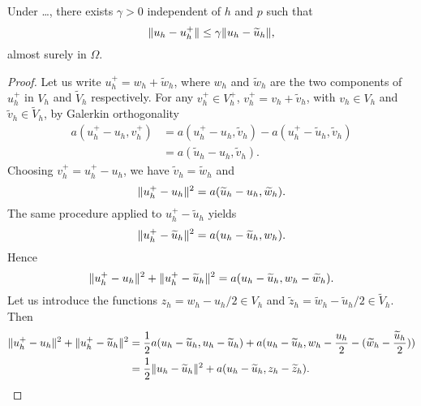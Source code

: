 \begin{lemma} Under \ldots, there exists $\gamma > 0$ independent of $h$ and $p$ such that
	\begin{equation}
		\lVert u_h - u_h^+\rVert \leq \gamma \lVert u_h - \widetilde u_h\rVert,
	\end{equation}
	almost surely in $\Omega$.
\end{lemma}
\begin{proof} Let us write $u_h^+ = w_h + \widetilde w_h$, where $w_h$ and $\widetilde w_h$ are the two components of $u^+_h$ in $V_h$ and $\widetilde V_h$ respectively. For any $v_h^+ \in V_h^+$, $v_h^+ = v_h + \widetilde v_h$, with $v_h \in V_h$ and $\widetilde v_h \in \widetilde V_h$, by Galerkin orthogonality 
	\begin{equation}
	\begin{aligned}
		a(u_h^+ - u_h, v_h^+) &= a(u_h^+ - u_h, \widetilde v_h) - a(u_h^+ - \widetilde u_h, \widetilde v_h) \\
		&= a(\widetilde u_h - u_h, \widetilde v_h).
	\end{aligned}
	\end{equation}
	Choosing $v_h^+ = u_h^+ - u_h$, we have $\widetilde v_h = \widetilde w_h$ and 
	\begin{equation}
		\lVert u_h^+ - u_h\rVert^2 = a(\widetilde u_h - u_h, \widetilde w_h).
	\end{equation}
	The same procedure applied to $u_h^+ - \widetilde u_h$ yields
	\begin{equation}
		\lVert u_h^+ - \widetilde u_h\rVert^2 = a(u_h - \widetilde u_h, w_h).
	\end{equation}
	Hence
	\begin{equation}
		\lVert u_h^+ - u_h\rVert^2 + \lVert u_h^+ - \widetilde u_h\rVert^2 = a(u_h - \widetilde u_h, w_h - \widetilde w_h).
	\end{equation}
	Let us introduce the functions $z_h = w_h - u_h/2 \in V_h$ and $\tilde z_h = \widetilde w_h - \widetilde u_h /2 \in \widetilde V_h$. Then
	\begin{equation}
	\begin{aligned}
		\lVert u_h^+ - u_h\rVert^2 + \lVert u_h^+ - \widetilde u_h\rVert^2 &= \frac12 a(u_h - \widetilde u_h, u_h - \widetilde u_h) + a(u_h - \widetilde u_h, w_h - \frac{u_h}{2} - (\widetilde w_h - \frac{\widetilde u_h}{2}))\\
		&= \frac{1}{2} \lVert u_h - \widetilde u_h\rVert^2 + a(u_h - \widetilde u_h, z_h - \widetilde z_h).
	\end{aligned}
	\end{equation} 

\end{proof}
